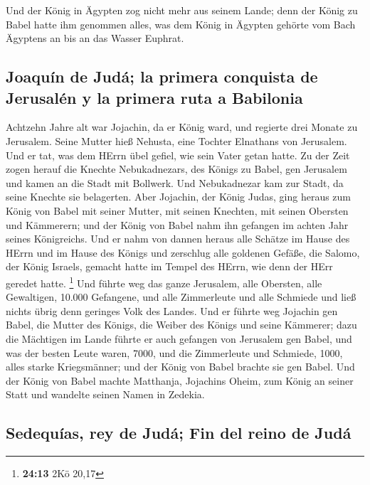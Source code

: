  Und der König in Ägypten zog nicht mehr aus seinem Lande;
denn der König zu Babel hatte ihm genommen alles, was dem König in
Ägypten gehörte vom Bach Ägyptens an bis an das Wasser Euphrat.

\hypertarget{joaquuxedn-de-juduxe1-la-primera-conquista-de-jerusaluxe9n-y-la-primera-ruta-a-babilonia}{%
\subsection{Joaquín de Judá; la primera conquista de Jerusalén y la
primera ruta a
Babilonia}\label{joaquuxedn-de-juduxe1-la-primera-conquista-de-jerusaluxe9n-y-la-primera-ruta-a-babilonia}}

 Achtzehn Jahre alt war Jojachin, da er König ward, und
regierte drei Monate zu Jerusalem. Seine Mutter hieß Nehusta, eine
Tochter Elnathans von Jerusalem.  Und er tat, was dem
HErrn übel gefiel, wie sein Vater getan hatte.  Zu der
Zeit zogen herauf die Knechte Nebukadnezars, des Königs zu Babel, gen
Jerusalem und kamen an die Stadt mit Bollwerk.  Und
Nebukadnezar kam zur Stadt, da seine Knechte sie belagerten.
 Aber Jojachin, der König Judas, ging heraus zum König
von Babel mit seiner Mutter, mit seinen Knechten, mit seinen Obersten
und Kämmerern; und der König von Babel nahm ihn gefangen im achten Jahr
seines Königreichs.  Und er nahm von dannen heraus alle
Schätze im Hause des HErrn und im Hause des Königs und zerschlug alle
goldenen Gefäße, die Salomo, der König Israels, gemacht hatte im Tempel
des HErrn, wie denn der HErr geredet hatte. \footnote{\textbf{24:13} 2Kö
  20,17}  Und führte weg das ganze Jerusalem, alle
Obersten, alle Gewaltigen, 10.000 Gefangene, und alle Zimmerleute und
alle Schmiede und ließ nichts übrig denn geringes Volk des Landes.
 Und er führte weg Jojachin gen Babel, die Mutter des
Königs, die Weiber des Königs und seine Kämmerer; dazu die Mächtigen im
Lande führte er auch gefangen von Jerusalem gen Babel, 
und was der besten Leute waren, 7000, und die Zimmerleute und Schmiede,
1000, alles starke Kriegsmänner; und der König von Babel brachte sie gen
Babel.  Und der König von Babel machte Matthanja,
Jojachins Oheim, zum König an seiner Statt und wandelte seinen Namen in
Zedekia.

\hypertarget{sedequuxedas-rey-de-juduxe1-fin-del-reino-de-juduxe1}{%
\subsection{Sedequías, rey de Judá; Fin del reino de
Judá}\label{sedequuxedas-rey-de-juduxe1-fin-del-reino-de-juduxe1}}

